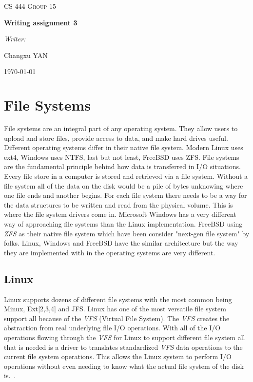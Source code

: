 \documentclass[10pt,draftclsnofoot,onecolumn,journal,compsoc]{IEEEtran}
\begin{document}
\begin{titlepage}
    \begin{center}
        \vfill
        \textsc{\LARGE CS 444 Group 15}\par
        \vspace{1cm}
        { \huge \bfseries Writing assignment 3 \par}
        \vfill
        \emph{Writer:}\par
        Changxu \textsc{YAN}\par
        \vfill
        {\large \today\par}
    \end{center}
\end{titlepage}


\section{File Systems}
File systems are an integral part of any operating system. They allow users to upload and store files, provide access to data, and make hard drives useful. Different operating systems differ in their native file system. Modern Linux uses ext4, Windows uses NTFS, last but not least, FreeBSD uses ZFS. File systems are the fundamental principle behind how data is transferred in I/O situations. Every file store in a computer is stored and retrieved via a file system. Without a file system all of the data on the disk would be a pile of bytes unknowing where one file ends and another begins. For each file system there needs to be a way for the data structures to be written and read from the physical volume. This is where the file system drivers come in. Microsoft Windows has a very different way of approaching file systems than the Linux implementation. FreeBSD using \textit{ZFS} as their native file system which have been consider "next-gen file system" by folks. Linux, Windows and FreeBSD have the similar architecture but the way they are implemented with in the operating systems are very different.

\subsection*{Linux} 
Linux supports dozens of different file systems with the most common being Minux, Ext[2,3,4] and JFS. Linux has one of the most versatile file system support all because of the \textit{VFS} (Virtual File System). The \textit{VFS} creates the abstraction from real underlying file I/O operations. With all of the I/O operations flowing through the \textit{VFS} for Linux to support different file system all that is needed is a driver to translates standardized \textit{VFS} data operations to the current file system operations. This allows the Linux system to perform I/O operations without even needing to know what the actual file system of the disk is.~\cite{Love}.
\end{document}
